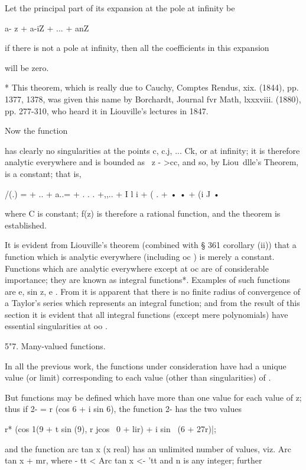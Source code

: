 {{{{Let the principal part of its expansion at the pole at infinity be

a- z + a-iZ + ... + anZ \

if there is not a pole at infinity, then all the coefficients in this
expansion

will be zero.

* This theorem, which is really due to Cauchy, Comptes Rendus, xix.
(1844), pp. 1377, 1378, was given this name by Borchardt, Journal fvr
Math, lxxxviii. (1880), pp. 277-310, who heard it in Liouville's
lectures in 1847.

%
%

Now the function

has clearly no singularities at the points c, c.j, ... Ck, or at
infinity; it is therefore analytic everywhere and is bounded as \ z -
>cc, and so, by Liou\ dlle's Theorem, is a constant; that is,

/(.) = + .. + a..= + . . . +,,.. + I l i + ( . + • • + (i J •

where C is constant; f(z) is therefore a rational function, and the
theorem is established.

It is evident from Liouville's theorem (combined with § 361 corollary
(ii)) that a function which is analytic everywhere (including oc ) is
merely a constant. Functions which are analytic everywhere except at
oc are of considerable importance; they are known as integral
functions*. Examples of such functions are e, sin z, e . From
it is apparent that there is no finite radius of convergence of a
Taylor's series which represents an integral function; and from the
result of this section it is evident that all integral functions
(except mere polynomials) have essential singularities at oo .

5"7. Many-valued functions.

In all the previous work, the functions under consideration have had a
unique value (or limit) corresponding to each value (other than
singularities) of .

But functions may be defined which have more than one value for each
value of z; thus if 2- = r (cos 6 + i sin 6), the function 2- has the
two values

r* (cos 1(9 + t sin (9), r jcos \ 0 + lir) + i sin \ (6 + 27r)|;

and the function arc tan x (x real) has an unlimited number of values,
viz. Arc tan x + mr, where - tt < Arc tan x <- 'tt and n is any
integer; further

}}}}

